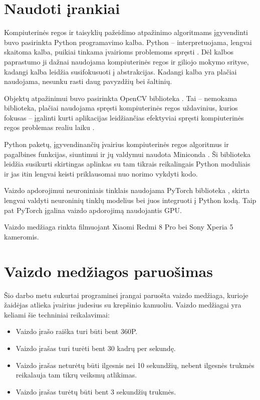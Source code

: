 \documentclass{VUMIFPSbakalaurinis}
\begin{document}
\section{Naudoti įrankiai}

Kompiuterinės regos ir taisyklių pažeidimo atpažinimo algoritmams įgyvendinti buvo pasirinkta Python programavimo kalba. Python – interpretuojama, lengvai skaitoma kalba, puikiai tinkama įvairioms problemoms spręsti \cite{Python}. Dėl kalbos paprastumo ji dažnai naudojama kompiuterinės regos ir giliojo mokymo srityse, kadangi kalba leidžia susifokusuoti į abstrakcijas. Kadangi kalba yra plačiai naudojama, nesunku rasti daug pavyzdžių bei šaltinių. 

Objektų atpažinimui buvo pasirinkta OpenCV biblioteka \cite{opencv}. Tai – nemokama biblioteka, plačiai naudojama spręsti kompiuterinės regos uždavinius, kurios fokusas – įgalinti kurti aplikacijas leidžiančias efektyviai spręsti kompiuterinės regos problemas realiu laiku \cite{BradskiOpenCV}.

Python paketų, įgyvendinančių įvairius kompiuterinės regos algoritmus ir pagalbines funkcijas, siuntimui ir jų valdymui naudota Miniconda \cite{conda}. Ši biblioteka leidžia susikurti skirtingas aplinkas su tam tikrais reikalingais Python moduliais ir jas itin lengvai keisti priklausomai nuo norimo vykdyti kodo.

Vaizdo apdorojimui neuroniniais tinklais naudojama PyTorch biblioteka \cite{pytorch}, skirta lengvai valdyti neuroninių tinklų modelius bei juos integruoti į Python kodą. Taip pat PyTorch įgalina vaizdo apdorojimą naudojantis GPU. 

Vaizdo medžiaga rinkta filmuojant Xiaomi Redmi 8 Pro bei Sony Xperia 5 kameromis.  

\section{Vaizdo medžiagos paruošimas}

Šio darbo metu sukurtai programinei įrangai paruošta vaizdo medžiaga, kurioje žaidėjas atlieka įvairius judesius su krepšinio kamuoliu. Vaizdo medžiagai yra keliami šie techniniai reikalavimai: 

\begin{itemize}
	\item Vaizdo įrašo raiška turi būti bent 360P. 
	\item Vaizdo įrašas turi turėti bent 30 kadrų per sekundę. 
	\item Vaizdo įrašas neturėtų būti ilgesnis nei 10 sekundžių, nebent ilgesnės trukmės reikalauja tam tikrų veiksmų atlikimas.
	\item Vaizdo įrašas turėtų būti bent 3 sekundžių trukmės.
\end{itemize}
\end{document}
